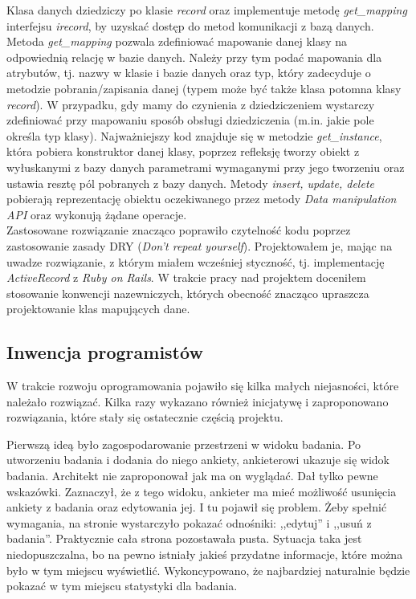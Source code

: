 Klasa danych dziedziczy po klasie \emph{record} oraz implementuje metodę \emph{get\_mapping} interfejsu \emph{irecord}, by uzyskać dostęp do metod komunikacji z bazą danych. Metoda \emph{get\_mapping} pozwala zdefiniować mapowanie danej klasy na odpowiednią relację w bazie danych. Należy przy tym podać mapowania dla atrybutów, tj. nazwy w klasie i bazie danych oraz typ, który zadecyduje o metodzie pobrania/zapisania danej (typem może być także klasa potomna klasy \emph{record}). W przypadku, gdy mamy do czynienia z dziedziczeniem wystarczy zdefiniować przy mapowaniu sposób obsługi dziedziczenia (m.in. jakie pole określa typ klasy). Najważniejszy kod znajduje się w metodzie \emph{get\_instance}, która pobiera konstruktor danej klasy, poprzez refleksję tworzy obiekt z wyłuskanymi z bazy danych parametrami wymaganymi przy jego tworzeniu oraz ustawia resztę pól pobranych z bazy danych. Metody \emph{insert, update, delete} pobierają reprezentację obiektu oczekiwanego przez metody \emph{Data manipulation API} oraz wykonują żądane operacje.\\
Zastosowane rozwiązanie znacząco poprawiło czytelność kodu poprzez zastosowanie zasady DRY (\emph{Don't repeat yourself}). Projektowałem je, mając na uwadze rozwiązanie, z którym miałem wcześniej styczność, tj. implementację \emph{ActiveRecord} z \emph{Ruby on Rails}. W trakcie pracy nad projektem doceniłem stosowanie konwencji nazewniczych, których obecność znacząco upraszcza projektowanie klas mapujących dane.

\subsection{Inwencja programistów}
\label{Chapter62d}

W trakcie rozwoju oprogramowania pojawiło się kilka małych niejasności, które należało rozwiązać. Kilka razy wykazano również inicjatywę i zaproponowano rozwiązania, które stały się ostatecznie częścią projektu.

Pierwszą ideą było zagospodarowanie przestrzeni w widoku badania. Po utworzeniu badania i dodania do niego ankiety, ankieterowi ukazuje się widok badania. Architekt nie zaproponował jak ma on wyglądać. Dał tylko pewne wskazówki. Zaznaczył, że z tego widoku, ankieter ma mieć możliwość usunięcia ankiety z badania oraz edytowania jej. I tu pojawił się problem. Żeby spełnić wymagania, na stronie wystarczyło pokazać odnośniki: ,,edytuj'' i ,,usuń z badania''. Praktycznie cała strona pozostawała pusta. Sytuacja taka jest niedopuszczalna, bo na pewno istniały jakieś przydatne informacje, które można było w tym miejscu wyświetlić. Wykoncypowano, że najbardziej naturalnie będzie pokazać w tym miejscu statystyki dla badania.


